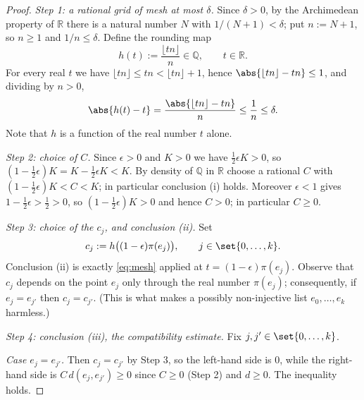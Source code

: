 \begin{proof}
  \emph{Step 1: a rational grid of mesh at most $\delta$.} Since $\delta > 0$, by the Archimedean
  property of $\mathbb{R}$ there is a natural number $N$ with $1/(N+1) < \delta$; put $n := N+1$, so
  $n \ge 1$ and $1/n \le \delta$. Define the rounding map
  \[
    h(t) := \frac{\lfloor t n \rfloor}{n} \in \mathbb{Q}
    ,\qquad t \in \mathbb{R}
    .
  \]
  For every real $t$ we have $\lfloor tn \rfloor \le tn < \lfloor tn \rfloor + 1$, hence
  $\abs{\lfloor tn\rfloor - tn} \le 1$, and dividing by $n > 0$,
  \begin{equation}\label{eq:mesh}
    \abs{h(t) - t} = \frac{\abs{\lfloor tn\rfloor - tn}}{n} \le \frac1n \le \delta
    .
  \end{equation}
  Note that $h$ is a function of the real number $t$ alone.

  \emph{Step 2: choice of $C$.} Since $\epsilon > 0$ and $K > 0$ we have $\tfrac12 \epsilon K > 0$,
  so $(1-\tfrac12\epsilon)K = K - \tfrac12\epsilon K < K$. By density of $\mathbb{Q}$ in
  $\mathbb{R}$ choose a rational $C$ with $(1-\tfrac12\epsilon)K < C < K$; in particular conclusion
  (i) holds. Moreover $\epsilon < 1$ gives $1 - \tfrac12\epsilon > \tfrac12 > 0$, so
  $(1-\tfrac12\epsilon)K > 0$ and hence $C > 0$; in particular $C \ge 0$.

  \emph{Step 3: choice of the $c_j$, and conclusion (ii).} Set
  \[
    c_j := h\bigl((1-\epsilon)\pi(e_j)\bigr)
    ,\qquad j \in \set{0,\dots,k}
    .
  \]
  Conclusion (ii) is exactly \eqref{eq:mesh} applied at $t = (1-\epsilon)\pi(e_j)$. Observe that
  $c_j$ depends on the point $e_j$ only through the real number $\pi(e_j)$; consequently, if $e_j =
  e_{j'}$ then $c_j = c_{j'}$. (This is what makes a possibly non-injective list $e_0,\dots,e_k$
  harmless.)

  \emph{Step 4: conclusion (iii), the compatibility estimate.} Fix $j,j' \in \set{0,\dots,k}$.

  \emph{Case $e_j = e_{j'}$.} Then $c_j = c_{j'}$ by Step 3, so the left-hand side is $0$, while the
  right-hand side is $C\,d(e_j,e_{j'}) \ge 0$ since $C \ge 0$ (Step 2) and $d \ge 0$. The inequality
  holds.


\end{proof}
